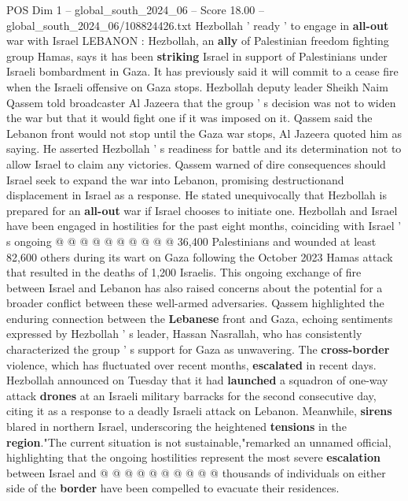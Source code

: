\begin{textsample}{POS Dim 1 – global\_south\_2024\_06 – Score 18.00 – global\_south\_2024\_06/108824426.txt}  \label{ex:f1_pos_140}
Hezbollah ' ready ' to engage in \textbf{all-out} war with Israel LEBANON : Hezbollah, an \textbf{ally} of Palestinian freedom fighting group Hamas, says it has been \textbf{striking} Israel in support of Palestinians under Israeli bombardment in Gaza.
It has previously said it will commit to a cease fire when the Israeli offensive on Gaza stops.
Hezbollah deputy leader Sheikh Naim Qassem told broadcaster Al Jazeera that the group ' s decision was not to widen the war but that it would fight one if it was imposed on it.
Qassem said the Lebanon front would not stop until the Gaza war stops, Al Jazeera quoted him as saying.
He asserted Hezbollah ' s readiness for battle and its determination not to allow Israel to claim any victories.
Qassem warned of dire consequences should Israel seek to expand the war into Lebanon, promising destructionand displacement in Israel as a response.
He stated unequivocally that Hezbollah is prepared for an \textbf{all-out} war if Israel chooses to initiate one.
Hezbollah and Israel have been engaged in hostilities for the past eight months, coinciding with Israel ' s ongoing @ @ @ @ @ @ @ @ @ @ 36,400 Palestinians and wounded at least 82,600 others during its wart on Gaza following the October 2023 Hamas attack that resulted in the deaths of 1,200 Israelis.
This ongoing exchange of fire between Israel and Lebanon has also raised concerns about the potential for a broader conflict between these well-armed adversaries.
Qassem highlighted the enduring connection between the \textbf{Lebanese} front and Gaza, echoing sentiments expressed by Hezbollah ' s leader, Hassan Nasrallah, who has consistently characterized the group ' s support for Gaza as unwavering.
The \textbf{cross-border} violence, which has fluctuated over recent months, \textbf{escalated} in recent days.
Hezbollah announced on Tuesday that it had \textbf{launched} a squadron of one-way attack \textbf{drones} at an Israeli military barracks for the second consecutive day, citing it as a response to a deadly Israeli attack on Lebanon.
Meanwhile, \textbf{sirens} blared in northern Israel, underscoring the heightened \textbf{tensions} in the \textbf{region}."The current situation is not sustainable,"remarked an unnamed official, highlighting that the ongoing hostilities represent the most severe \textbf{escalation} between Israel and @ @ @ @ @ @ @ @ @ @ thousands of individuals on either side of the \textbf{border} have been compelled to evacuate their residences.

\end{textsample}
